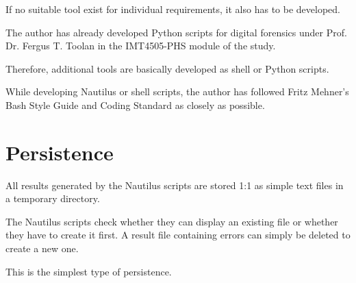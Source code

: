 If no suitable tool exist for individual requirements, it also has to be developed.

The author has already developed Python scripts for digital forensics under Prof. Dr. Fergus T. Toolan in the IMT4505-PHS module of the study.

Therefore, additional tools are basically developed as shell or Python scripts.

While developing Nautilus or shell scripts, the author has followed Fritz Mehner's Bash Style Guide and Coding Standard as closely as possible. \cite{Mehner2014}

\section{Persistence}

All results generated by the Nautilus scripts are stored 1:1 as simple text files in a temporary directory.

The Nautilus scripts check whether they can display an existing file or whether they have to create it first. A result file containing errors can simply be deleted to create a new one.

This is the simplest type of persistence.
